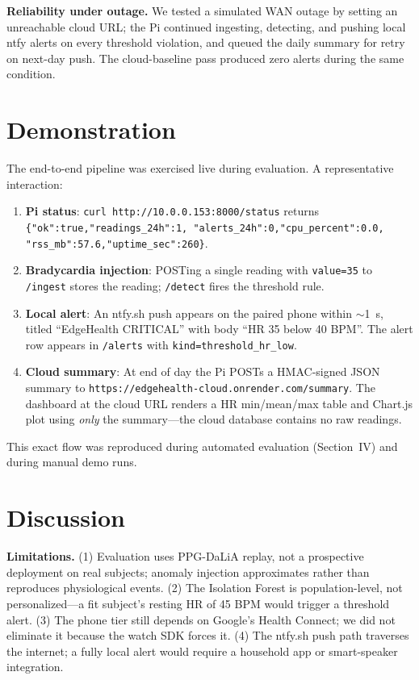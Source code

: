\documentclass[conference]{IEEEtran}
\begin{document}
\textbf{Reliability under outage.} We tested a simulated WAN outage by setting an unreachable cloud URL; the Pi continued ingesting, detecting, and pushing local ntfy alerts on every threshold violation, and queued the daily summary for retry on next-day push. The cloud-baseline pass produced zero alerts during the same condition.

\section{Demonstration}

The end-to-end pipeline was exercised live during evaluation. A representative interaction:

\begin{enumerate}
    \item \textbf{Pi status}: \texttt{curl http://10.0.0.153:8000/status} returns
    \texttt{\{"ok":true,"readings\_24h":1, "alerts\_24h":0,"cpu\_percent":0.0, "rss\_mb":57.6,"uptime\_sec":260\}}.
    \item \textbf{Bradycardia injection}: POSTing a single reading with \texttt{value=35} to \texttt{/ingest} stores the reading; \texttt{/detect} fires the threshold rule.
    \item \textbf{Local alert}: An ntfy.sh push appears on the paired phone within $\sim$1~s, titled ``EdgeHealth CRITICAL'' with body ``HR 35 below 40 BPM''. The alert row appears in \texttt{/alerts} with \texttt{kind=threshold\_hr\_low}.
    \item \textbf{Cloud summary}: At end of day the Pi POSTs a HMAC-signed JSON summary to \texttt{https://edgehealth-cloud.onrender.com/summary}. The dashboard at the cloud URL renders a HR min/mean/max table and Chart.js plot using \emph{only} the summary---the cloud database contains no raw readings.
\end{enumerate}

This exact flow was reproduced during automated evaluation (Section~IV) and during manual demo runs.

\section{Discussion}

\textbf{Limitations.} (1) Evaluation uses PPG-DaLiA replay, not a prospective deployment on real subjects; anomaly injection approximates rather than reproduces physiological events. (2) The Isolation Forest is population-level, not personalized---a fit subject's resting HR of 45 BPM would trigger a threshold alert. (3) The phone tier still depends on Google's Health Connect; we did not eliminate it because the watch SDK forces it. (4) The ntfy.sh push path traverses the internet; a fully local alert would require a household app or smart-speaker integration.
\end{document}

